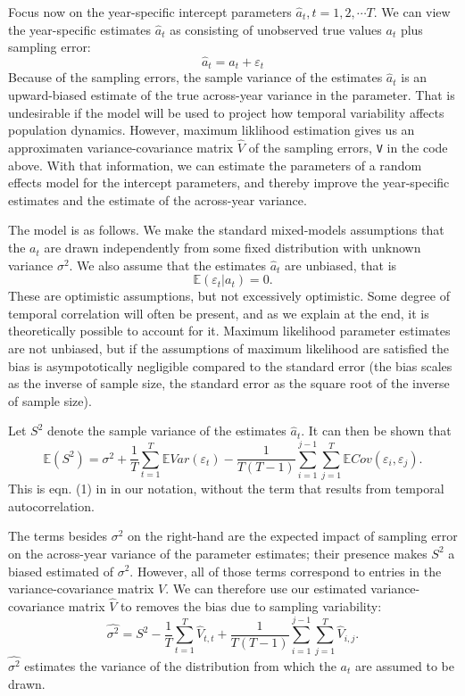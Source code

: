 \documentclass[12pt]{article}
\newcommand{\be}{\begin{equation}}
\newcommand{\ee}{\end{equation}}
\begin{document}
Focus now on the year-specific intercept parameters $\hat{a}_t, t = 1,2,\cdots T$. 
We can view the year-specific estimates $\hat{a}_t$ as consisting of unobserved true values $a_t$ plus sampling error:
\be
\hat{a}_t= a_t + \varepsilon_t 
\ee
Because of the sampling errors, the sample variance of
the estimates $\hat{a}_t$ is an upward-biased estimate of the true across-year variance in the parameter. 
That is undesirable if the model will be used to project how temporal variability affects population dynamics. 
However, maximum liklihood estimation gives us an approximaten variance-covariance matrix $\hat{V}$ of the
sampling errors, \texttt{V} in the code above. With that information, we can estimate the parameters
of a random effects model for the intercept parameters, and thereby improve the year-specific estimates and
the estimate of the across-year variance.  

The model is as follows. We make the standard mixed-models assumptions that the $a_t$ are drawn 
independently from some fixed distribution with unknown variance $\sigma^2$. We also assume that the estimates 
$\hat{a}_t$ are unbiased, that is
\be
\mathbb{E}(\varepsilon_t \vert a_t) = 0.    
\ee
These are optimistic assumptions, but not excessively optimistic. Some degree of temporal correlation will often be
present, and as we explain at the end, it is theoretically possible to account for it. 
Maximum likelihood parameter estimates are not unbiased, but if the assumptions
of maximum likelihood are satisfied the bias is asympototically negligible compared to the standard error (the 
bias scales as the inverse of sample size, the standard error as the square root of the inverse of sample size).  

Let $S^2$ denote the sample variance of the estimates $\hat{a}_t$. It can then be shown that 
\be
\mathbb{E}(S^2) = \sigma^2  + \frac{1}{T}\sum\limits_{t=1}^T \mathbb{E} Var(\varepsilon_t) 
- \frac{1}{T(T-1)}\sum\limits_{i=1}^{j-1} \sum\limits_{j=1}^T \mathbb{E}Cov(\varepsilon_i, \varepsilon_j). 
\label{eqn:biasTerms}
\ee
This is eqn. (1) in \citet{gould-nichols-1998} in our notation, without the term that 
results from temporal autocorrelation. 

The terms besides $\sigma^2$ on the right-hand are the expected impact of sampling error on the across-year variance
of the parameter estimates; their presence makes $S^2$ a biased estimated of $\sigma^2$. However,
all of those terms correspond to entries in the variance-covariance matrix $V$. We can therefore use our estimated
variance-covariance matrix $\hat{V}$ to removes the bias due to sampling variability: 
\be
\hat{\sigma^2}  = S^2 - \frac{1}{T}\sum\limits_{t=1}^T \hat{V}_{t,t} + 
\frac{1}{T(T-1)}\sum\limits_{i=1}^{j-1} \sum\limits_{j=1}^T \hat{V}_{i,j}. 
\label{eqn:hatSigma}
\ee
$\hat{\sigma^2}$ estimates the variance of the distribution from which the $a_t$ are assumed
to be drawn. 
\end{document}
